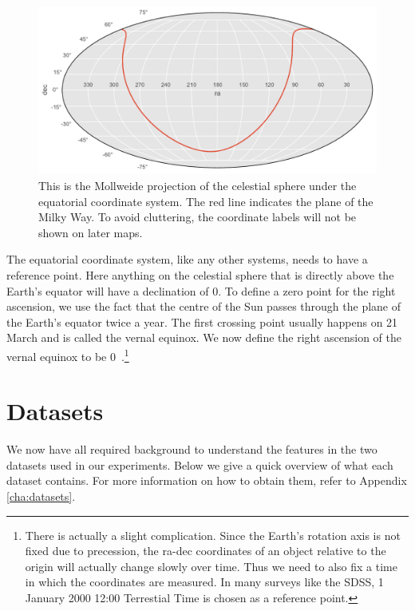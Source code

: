 \begin{figure}[tbp]
	\centering
	\includegraphics[width=\textwidth]{figures/2_astro/mollweide_map}
	\caption[Mollweide projection of the celestial sphere]{This is the Mollweide projection
		of the celestial sphere under the equatorial coordinate system.
		The red line indicates the plane of the Milky Way. To avoid cluttering, the coordinate labels will not be shown on later maps.}
	\label{fig:mollweide} 
\end{figure}

The equatorial coordinate system, like any other systems, needs to have a reference point. Here
anything on the celestial sphere that is directly above the Earth's equator will have a declination
of 0\deg. To define a zero point for the right ascension, we use the fact that the centre of the Sun
passes through the plane of the Earth's equator twice a year. The first crossing point usually
happens on 21 March and is called the vernal equinox. We now define the right ascension of the
vernal equinox to be 0\deg~\cite[Chapter~1]{sparke07}.\footnote{ There is actually a slight
	complication. Since the Earth's rotation axis is not fixed due to precession, the ra-dec coordinates
	of an object relative to the origin will actually change slowly over time. Thus we need to also fix
	a time in which the coordinates are measured. In many surveys like the SDSS, 1 January 2000 12:00
	Terrestial Time is chosen as a reference point.}




\section{Datasets}
\label{sec:datasets}

We now have all required background to understand the
features in the two datasets used in our experiments. Below we give a quick overview of what each
dataset contains. For more information on how to obtain them, refer to Appendix \ref{cha:datasets}.

